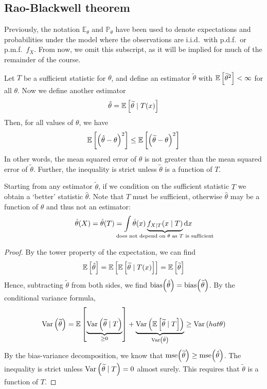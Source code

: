 \subsection{Rao-Blackwell theorem}
Previously, the notation \( \mathbb E_\theta \) and \( \mathbb P_\theta \) have been used to denote expectations and probabilities under the model where the observations are i.i.d.\ with p.d.f.\ or p.m.f.\ \( f_X \).
From now, we omit this subscript, as it will be implied for much of the remainder of the course.
\begin{theorem}
	Let \( T \) be a sufficient statistic for \( \theta \), and define an estimator \( \widetilde \theta \) with \( \mathbb{E}\left[{{\widetilde \theta}^2}\right] < \infty \) for all \( \theta \).
	Now we define another estimator
	\[ \hat \theta = \mathbb{E}\left[{\widetilde \theta \mid T(x)}\right] \]
	Then, for all values of \( \theta \), we have
	\[ \mathbb{E}\left[{\qty(\hat \theta - \theta)^2}\right] \leq \mathbb{E}\left[{\qty(\widetilde \theta - \theta)^2}\right] \]
	In other words, the mean squared error of \( \hat \theta \) is not greater than the mean squared error of \( \widetilde \theta \).
	Further, the inequality is strict unless \( \widetilde \theta \) is a function of \( T \).
\end{theorem}
\begin{remark}
	Starting from any estimator \( \widetilde \theta \), if we condition on the sufficient statistic \( T \) we obtain a `better' statistic \( \hat \theta \).
	Note that \( T \) must be sufficient, otherwise \( \hat \theta \) may be a function of \( \theta \) and thus not an estimator:
	\[ \hat \theta(X) = \hat \theta(T) = \int \hat \theta(x) \underbrace{f_{X \mid T}(x \mid T)}_{\mathclap{\text{does not depend on } \theta \text{ as } T \text{ is sufficient}}} \dd{x} \]
\end{remark}
\begin{proof}
	By the tower property of the expectation, we can find
	\[ \mathbb{E}\left[{\hat \theta}\right] = \mathbb{E}\left[{\mathbb{E}\left[{\widetilde \theta \mid T(x)}\right]}\right] = \mathbb{E}\left[{\widetilde \theta}\right] \]
	Hence, subtracting \( \widetilde \theta \) from both sides, we find \( \mathrm{bias}\qty(\hat\theta) = \mathrm{bias}\qty(\widetilde\theta) \).
	By the conditional variance formula,
	\[ \operatorname{Var}\left({\widetilde \theta}\right) = \mathbb{E}\left[{\underbrace{\operatorname{Var}\left({\widetilde \theta \mid T}\right)}_{\geq 0}}\right] + \underbrace{\operatorname{Var}\left({\mathbb{E}\left[{\widetilde \theta \mid T}\right]}\right)}_{\operatorname{Var}\left({\hat\theta}\right)} \geq \operatorname{Var}\left({hat \theta}\right) \]
	By the bias-variance decomposition, we know that \( \mathrm{mse}\qty(\widetilde \theta) \geq \mathrm{mse}\qty(\hat \theta) \).
	The inequality is strict unless \( \operatorname{Var}\left({\widetilde \theta \mid T}\right) = 0 \) almost surely.
	This requires that \( \widetilde \theta \) is a function of \( T \).
\end{proof}

